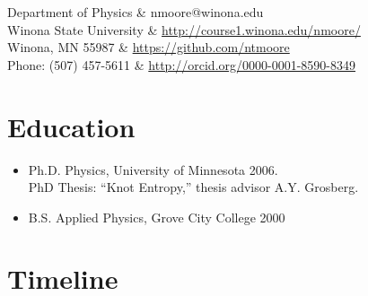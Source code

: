 \documentclass[margin,line,letterpaper]{res}
\begin{document}

\setlength{\leftmargini}{0em}
\renewcommand{\labelitemi}{}

\renewcommand{\namefont}{\large\textbf}



\begin{resume}

\begin{ncolumn}{2}
  Department of Physics		&   nmoore@winona.edu \\
  Winona State University	&  \url{http://course1.winona.edu/nmoore/}		\\
  Winona, MN 55987			&  \url{https://github.com/ntmoore}			\\
  Phone: (507) 457-5611		&  \url{http://orcid.org/0000-0001-8590-8349}	\\
\end{ncolumn}



\section{\bf Education}
\begin{itemize}
\item Ph.D. Physics, University of Minnesota 2006.\\
	 PhD Thesis: ``Knot Entropy,'' thesis advisor A.Y. Grosberg.
\item B.S. Applied Physics, Grove City College 2000
\end{itemize}

\section{\bf Timeline}


\end{resume}
\end{document}

